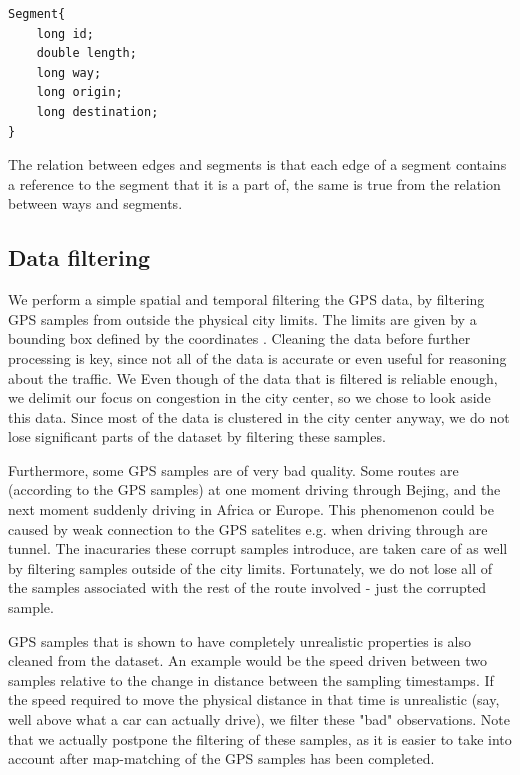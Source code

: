 \begin{lstlisting}[style=java, caption=Datastructure for a segment]
Segment{
	long id;
	double length;
	long way;
	long origin;
	long destination;
}
\end{lstlisting}

The relation between edges and segments is that each edge of a segment contains a reference to the segment that it is a part of, the same is true from the relation between ways and segments.

\subsection{Data filtering}\label{sec:datafiltering}
We perform a simple spatial and temporal filtering the GPS data, by filtering GPS samples from outside the physical city limits. The limits are given by a bounding box defined by the coordinates . Cleaning the data before further processing is key, since not all of the data is accurate or even useful for reasoning about the traffic. We Even though of the data that is filtered is reliable enough, we delimit our focus on congestion in the city center, so we chose to look aside this data. Since most of the data is clustered in the city center anyway, we do not lose significant parts of the dataset by filtering these samples.

Furthermore, some GPS samples are of very bad quality. Some routes are (according to the GPS samples) at one moment driving through Bejing, and the next moment suddenly driving in Africa or Europe. This phenomenon could be caused by weak connection to the GPS satelites e.g. when driving through are tunnel. The inacuraries these corrupt samples introduce, are taken care of as well by filtering samples outside of the city limits. Fortunately, we do not lose all of the samples associated with the rest of the route involved - just the corrupted sample.

GPS samples that is shown to have completely unrealistic properties is also cleaned from the dataset. An example would be the speed driven between two samples relative to the change in distance between the sampling timestamps. If the speed required to move the physical distance in that time is unrealistic (say, well above what a car can actually drive), we filter these "bad" observations. Note that we actually postpone the filtering of these samples, as it is easier to take into account after map-matching of the GPS samples has been completed.

